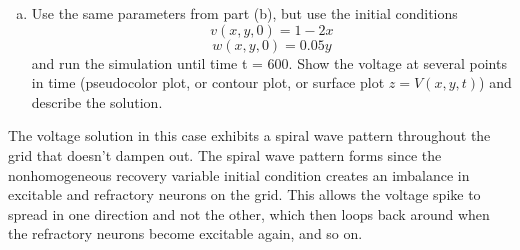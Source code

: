 \documentclass[12pt]{article}
\begin{document}
\begin{enumerate}[(a)]
\item  Use the same parameters from part (b), but use the initial conditions
$$v(x,y,0) = 1-2x$$
$$w(x,y,0) = 0.05y$$
and run the simulation until time t = 600. Show the voltage at several points in time (pseudocolor plot, or contour plot, or surface plot $z = V (x, y, t)$) and describe the solution.
\end{enumerate}

The voltage solution in this case exhibits a spiral wave pattern throughout the grid that doesn't dampen out.  The spiral wave pattern forms since the nonhomogeneous recovery variable initial condition creates an imbalance in excitable and refractory neurons on the grid.  This allows the voltage spike to spread in one direction and not the other, which then loops back around when the refractory neurons become excitable again, and so on.
\end{document}
